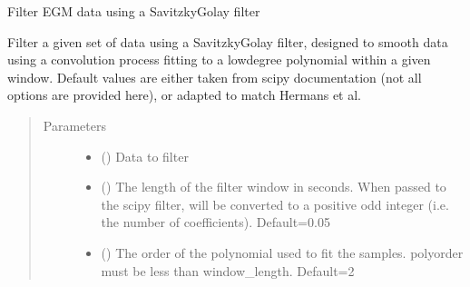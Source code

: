 \documentclass[letterpaper,10pt,english]{sphinxmanual}
\begin{document}
\begin{fulllineitems}
\label{\detokenize{_autosummary/tools.maths.filter_savitzkygolay:tools.maths.filter_savitzkygolay}}
\sphinxAtStartPar
Filter EGM data using a Savitzky\sphinxhyphen{}Golay filter

\sphinxAtStartPar
Filter a given set of data using a Savitzky\sphinxhyphen{}Golay filter, designed to smooth data using a convolution process
fitting to a low\sphinxhyphen{}degree polynomial within a given window. Default values are either taken from scipy
documentation (not all options are provided here), or adapted to match Hermans et al.
\begin{quote}\begin{description}
\item[{Parameters}] \leavevmode\begin{itemize}
\item {} 
\sphinxAtStartPar
{} () \textendash{} Data to filter

\item {} 
\sphinxAtStartPar
{} (\sphinxstyleliteralemphasis{\sphinxupquote{, }}) \textendash{} The length of the filter window in seconds. When passed to the scipy filter, will be converted to a
positive odd integer (i.e. the number of coefficients). Default=0.05

\item {} 
\sphinxAtStartPar
{} (\sphinxstyleliteralemphasis{\sphinxupquote{, }}) \textendash{} The order of the polynomial used to fit the samples. polyorder must be less than window\_length. Default=2


\end{itemize}
\end{description}
\end{quote}
\end{fulllineitems}
\end{document}
